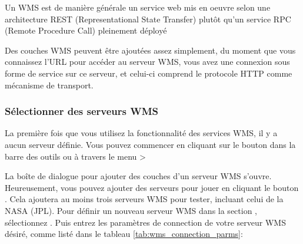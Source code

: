 Un WMS est de mani\`ere g\'en\'erale un service web mis en oeuvre selon une 
architecture REST (Representational State Transfer) plut\^ot qu'un service 
  RPC (Remote Procedure Call) pleinement d\'eploy\'e

Des couches WMS peuvent \^etre ajout\'ees assez simplement, du moment que vous
connaissez l'URL pour acc\'eder au serveur WMS, vous avez une connexion sous
forme de service sur ce serveur, et celui-ci comprend le protocole HTTP comme
m\'ecanisme de transport.

\subsubsection{S\'electionner des serveurs
WMS}\label{sec:ogc-wms-servers}

La premi\`ere fois que vous utilisez la fonctionnalit\'e des services WMS, il y a
aucun serveur d\'efinie. Vous pouvez commencer en cliquant sur le bouton
 dans la barre des
outils ou \`a travers le menu
>

La bo\^ite de dialogue  pour ajouter des
couches d'un serveur WMS s'ouvre. Heureusement, vous pouvez ajouter des
serveurs pour jouer en cliquant le bouton . Cela ajoutera au moins trois serveurs WMS pour tester, incluant celui
de la NASA (JPL). Pour d\'efinir un nouveau serveur WMS dans la section
, s\'electionnez . Puis entrez les
param\`etres de connection de votre serveur WMS d\'esir\'e, comme list\'e dans le
tableau \ref{tab:wms_connection_parms}:

